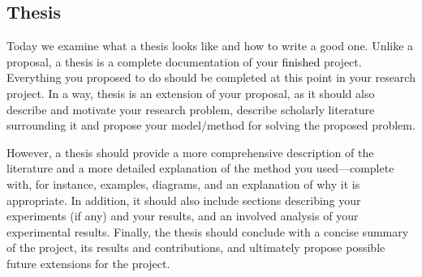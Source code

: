 
\usepackage[compact]{titlesec}




\subsection*{Thesis}

Today we examine what a thesis looks like and how to write a good one. Unlike a proposal, a thesis is a complete
documentation of your \textcolor{black}{finished} project. Everything you proposed to do should be completed at this
point in your research project. In a way, thesis is an extension of your proposal, as it should also describe and
motivate your research problem, describe scholarly literature surrounding it and propose your model/method for solving
the proposed problem.

However, a thesis should provide a more comprehensive description of the literature and a more detailed explanation of
the method you used---complete with, for instance, examples, diagrams, and an explanation of why it is appropriate. In
addition, it should also include sections describing your experiments (if any) and your results, and an involved
analysis of your experimental results. Finally, the thesis should conclude with a concise summary of the project, its
results and contributions, and ultimately propose possible future extensions for the project.

